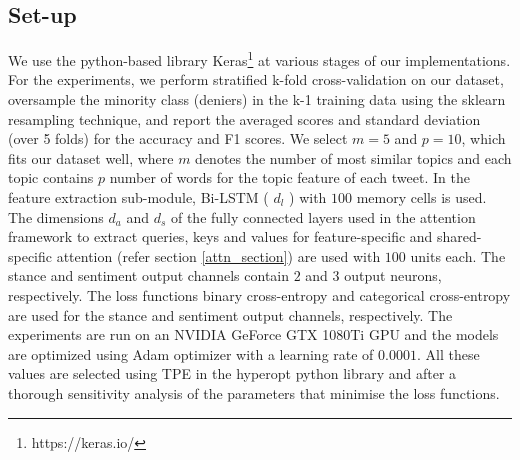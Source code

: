 \documentclass[letterpaper]{article} %
\begin{document}
\subsection{Set-up} We use the python-based library Keras\footnote{https://keras.io/} at various stages of our implementations. %
For the experiments, we perform stratified k-fold cross-validation on our dataset, oversample the minority class (deniers) in the k-1 training data using the sklearn resampling technique, and report the averaged scores and standard deviation (over 5 folds) for the accuracy and F1 scores. We select $m=5$ and $p=10$, which fits our dataset well, where $m$ denotes the number of most similar topics and each topic contains $p$ number of words for the topic feature of each tweet. In the feature extraction sub-module, Bi-LSTM ( $d_l$ ) with $100$ memory cells is used. The dimensions $d_a$ and $d_s$ of the fully connected layers used in the attention framework to extract queries, keys and values for feature-specific and shared-specific attention (refer section \ref{attn_section}) are used with $100$ units each. The stance and sentiment output channels contain $2$ and $3$ output neurons, respectively. The loss functions binary cross-entropy and categorical cross-entropy are used for the stance and sentiment output channels, respectively. The experiments are run on an NVIDIA GeForce GTX 1080Ti GPU and the models are optimized using Adam optimizer with a learning rate of $0.0001$. All these values are selected using TPE in the hyperopt python library \cite{bergstra2013hyperopt} and after a thorough sensitivity analysis of the parameters that minimise the loss functions.
\end{document}
